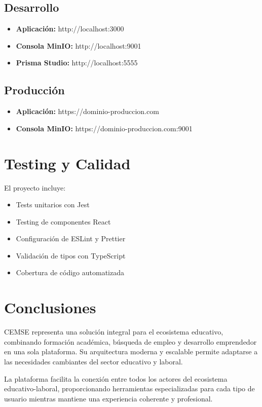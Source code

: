 \documentclass[12pt,a4paper]{article}
\begin{document}
\subsection{Desarrollo}
\begin{itemize}
    \item \textbf{Aplicación:} http://localhost:3000
    \item \textbf{Consola MinIO:} http://localhost:9001
    \item \textbf{Prisma Studio:} http://localhost:5555
\end{itemize}

\subsection{Producción}
\begin{itemize}
    \item \textbf{Aplicación:} https://dominio-produccion.com
    \item \textbf{Consola MinIO:} https://dominio-produccion.com:9001
\end{itemize}

\section{Testing y Calidad}

El proyecto incluye:

\begin{itemize}
    \item Tests unitarios con Jest
    \item Testing de componentes React
    \item Configuración de ESLint y Prettier
    \item Validación de tipos con TypeScript
    \item Cobertura de código automatizada
\end{itemize}

\section{Conclusiones}

CEMSE representa una solución integral para el ecosistema educativo, combinando formación académica, búsqueda de empleo y desarrollo emprendedor en una sola plataforma. Su arquitectura moderna y escalable permite adaptarse a las necesidades cambiantes del sector educativo y laboral.

La plataforma facilita la conexión entre todos los actores del ecosistema educativo-laboral, proporcionando herramientas especializadas para cada tipo de usuario mientras mantiene una experiencia coherente y profesional.
\end{document}

